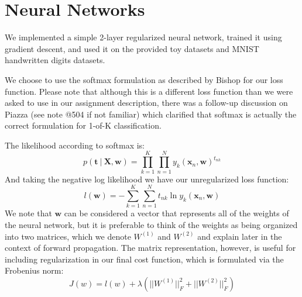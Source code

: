 \documentclass[10pt]{article}
\begin{document}
 



\section*{Neural Networks}

We implemented a simple 2-layer regularized neural network, trained it using gradient descent, and used it on the provided toy datasets and MNIST handwritten digits datasets.

We choose to use the softmax formulation as described by Bishop for our loss function.  Please note that although this is a different loss function than we were asked to use in our assignment description, there was a follow-up discussion on Piazza (see note @504 if not familiar) which clarified that softmax is actually the correct formulation for 1-of-K classification.

The likelihood according to softmax is:
%
%
\begin{equation}
p(\mathbf{t} \ | \ \mathbf{X}, \mathbf{w}) = \prod_{k=1}^K \prod_{n=1}^N y_k(\mathbf{x}_n,\mathbf{w})^{t_{nk}}
\end{equation}
%
%
And taking the negative log likelihood we have our unregularized loss function:
%
%
\begin{equation}
l(\mathbf{w})= - \sum_{k=1}^K \sum_{n=1}^N  t_{nk} \ln y_k(\mathbf{x}_n,\mathbf{w}) 
\end{equation}
%
%
We note that $\mathbf{w}$ can be considered a vector that represents all of the weights of the neural network, but it is preferable to think of the weights as being organized into two matrices, which we denote $W^{(1)}$ and $W^{(2)}$ and explain later in the context of forward propagation.  The matrix representation, however, is useful for including regularization in our final cost function, which is formulated via the Frobenius norm:
%
%
\begin{equation}
J(w) = l(w) + \lambda(||W^{(1)}||^2_F + ||W^{(2)}||^2_F)
\end{equation}
%
%
\end{document}
